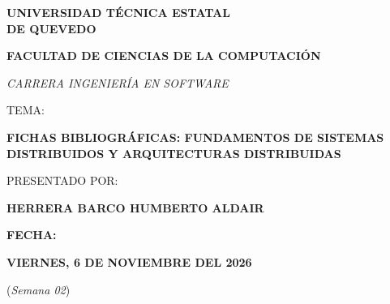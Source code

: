 \documentclass[12pt,a4paper]{article}
\begin{document}
\thispagestyle{empty}

\begin{center}

\vspace*{1.5cm}

{\fontsize{22}{26}\selectfont\bfseries UNIVERSIDAD TÉCNICA ESTATAL\\[4pt] DE QUEVEDO\par}

\vspace{1.4cm}

{\large\bfseries FACULTAD DE CIENCIAS DE LA COMPUTACIÓN\par}

\vspace{1.2cm}

{\small\itshape CARRERA INGENIERÍA EN SOFTWARE\par}

\vspace{1.4cm}

{\large TEMA:\par}

\vspace{0.6cm}

{\large\bfseries FICHAS BIBLIOGRÁFICAS: FUNDAMENTOS DE SISTEMAS DISTRIBUIDOS Y ARQUITECTURAS DISTRIBUIDAS\par}

\vspace{1.4cm}

{\large PRESENTADO POR:\par}
\vspace{2pt}
{\large\bfseries HERRERA BARCO HUMBERTO ALDAIR\par}

\vspace{1.4cm}

{\large\bfseries FECHA:\par}

\vspace{0.6cm}

{\large\bfseries VIERNES, 6 DE NOVIEMBRE DEL 2026\par}
{\large (\textit{Semana 02})\par}

\end{center}

\newpage
\end{document}
